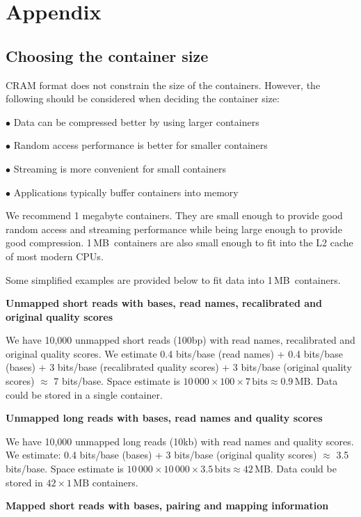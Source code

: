 \documentclass[a4paper]{article}
\newcommand\bits{\,\mbox{bits}}
\newcommand\MB{\,\mbox{MB}}
\begin{document}
\section{\textbf{Appendix}}
\subsection{\textbf{Choosing the container size}}

CRAM format does not constrain the size of the containers. However, the following 
should be considered when deciding the container size:

$\bullet$ Data can be compressed better by using larger containers

$\bullet$ Random access performance is better for smaller containers 

$\bullet$ Streaming is more convenient for small containers

$\bullet$ Applications typically buffer containers into memory

We recommend 1 megabyte containers. They are small enough to provide good random access
and streaming performance while being large enough to provide good compression. 
1\MB\ containers are also small enough to fit into the L2 cache of most modern CPUs.

Some simplified examples are provided below to fit data into 1\MB\ containers.

\textbf{Unmapped short reads with bases, read names, recalibrated and original 
quality scores}

We have 10,000 unmapped short reads (100bp) with read names, recalibrated and original 
quality scores. We estimate 0.4 bits/base (read names) + 0.4 bits/base (bases) 
+ 3 bits/base (recalibrated quality scores) + 3 bits/base (original quality scores) 
$\approx$ 7 bits/base. Space estimate is $10\,000 \times 100 \times 7 \bits
\approx 0.9 \MB$. Data could be stored in a single container.

\textbf{Unmapped long reads with bases, read names and quality scores}

We have 10,000 unmapped long reads (10kb) with read names and quality scores. We 
estimate: 0.4 bits/base (bases) + 3 bits/base (original quality scores) $\approx$
3.5 bits/base. Space estimate is $10\,000 \times 10\,000 \times 3.5 \bits
\approx 42 \MB$. Data could be stored in $42 \times 1\MB$ containers.

\textbf{Mapped short reads with bases, pairing and mapping information}
\end{document}

